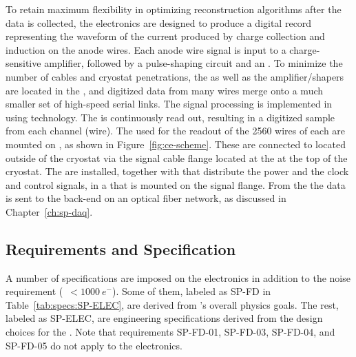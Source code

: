 To retain maximum flexibility in optimizing reconstruction algorithms after 
the  data is collected, the  electronics are designed 
to produce a digital record representing the waveform of the current produced 
by charge collection and induction on the anode wires. Each anode wire signal is 
input to a charge-sensitive amplifier, followed by a pulse-shaping circuit and 
an . To minimize the number of cables and cryostat penetrations, 
the  as well as the amplifier/shapers are located in the , 
and digitized data from many wires merge onto a much smaller set of high-speed 
serial links. The  signal processing is implemented in 
using  technology. The  is continuously read out, resulting 
in a digitized  sample from each  channel (wire). The 
 used for the readout of the \num{2560} wires of each  
are mounted on , as shown in Figure~\ref{fig:ce-scheme}. These are
connected to  located outside of the cryostat via the  signal 
cable flange located at the  \fdth at the top of the cryostat.
The  are installed, together with  that distribute
the power and the clock and control signals, in a  that is
mounted on the signal flange. From the  the data is sent to 
the  back-end on an optical fiber network, as discussed in 
Chapter~\ref{ch:sp-daq}. 

\subsection{Requirements and Specification}
\label{sec:fdsp-tpcelec-overview-requirements}

A number of specifications are imposed on the  electronics in addition to the 
noise requirement (~$<\SI{1000}{e^-}$). Some of them, labeled as 
SP-FD in Table~\ref{tab:specs:SP-ELEC}, are derived from 's 
overall physics goals. The rest, labeled as SP-ELEC, are engineering specifications 
derived from the design choices for the . Note that requirements 
SP-FD-01, SP-FD-03, SP-FD-04, and SP-FD-05 do not apply to the  electronics. 


\pagebreak


